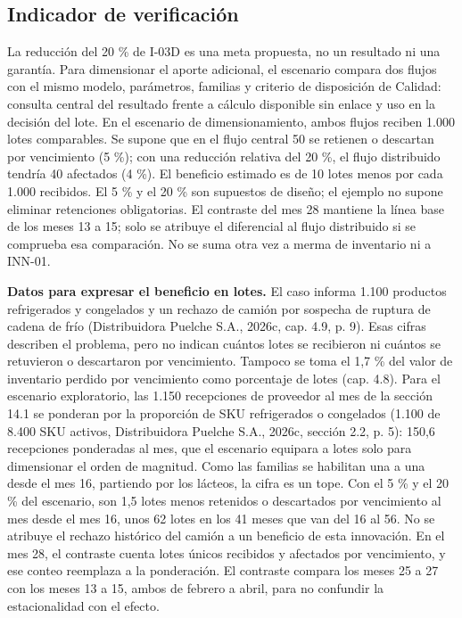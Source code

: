 \subsection{Indicador de verificación}

La reducción del 20 \% de I-03D es una meta propuesta, no un resultado ni una garantía. Para dimensionar el aporte adicional, el escenario compara dos flujos con el mismo modelo, parámetros, familias y criterio de disposición de Calidad: consulta central del resultado frente a cálculo disponible sin enlace y uso en la decisión del lote. En el escenario de dimensionamiento, ambos flujos reciben 1.000 lotes comparables. Se supone que en el flujo central 50 se retienen o descartan por vencimiento (5 \%); con una reducción relativa del 20 \%, el flujo distribuido tendría 40 afectados (4 \%). El beneficio estimado es de 10 lotes menos por cada 1.000 recibidos. El 5 \% y el 20 \% son supuestos de diseño; el ejemplo no supone eliminar retenciones obligatorias. El contraste del mes 28 mantiene la línea base de los meses 13 a 15; solo se atribuye el diferencial al flujo distribuido si se comprueba esa comparación. No se suma otra vez a merma de inventario ni a INN-01.

\textbf{Datos para expresar el beneficio en lotes.} El caso informa 1.100 productos refrigerados y congelados y un rechazo de camión por sospecha de ruptura de cadena de frío (Distribuidora Puelche S.A., 2026c, cap. 4.9, p. 9). Esas cifras describen el problema, pero no indican cuántos lotes se recibieron ni cuántos se retuvieron o descartaron por vencimiento. Tampoco se toma el 1,7 \% del valor de inventario perdido por vencimiento como porcentaje de lotes (cap. 4.8). Para el escenario exploratorio, las 1.150 recepciones de proveedor al mes de la sección 14.1 se ponderan por la proporción de SKU refrigerados o congelados (1.100 de 8.400 SKU activos, Distribuidora Puelche S.A., 2026c, sección 2.2, p. 5): 150,6 recepciones ponderadas al mes, que el escenario equipara a lotes solo para dimensionar el orden de magnitud. Como las familias se habilitan una a una desde el mes 16, partiendo por los lácteos, la cifra es un tope. Con el 5 \% y el 20 \% del escenario, son 1,5 lotes menos retenidos o descartados por vencimiento al mes desde el mes 16, unos 62 lotes en los 41 meses que van del 16 al 56. No se atribuye el rechazo histórico del camión a un beneficio de esta innovación. En el mes 28, el contraste cuenta lotes únicos recibidos y afectados por vencimiento, y ese conteo reemplaza a la ponderación. El contraste compara los meses 25 a 27 con los meses 13 a 15, ambos de febrero a abril, para no confundir la estacionalidad con el efecto.

